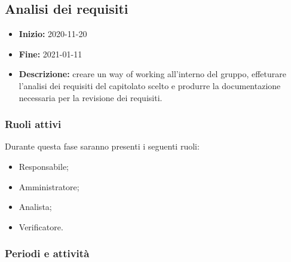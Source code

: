 
\subsection{Analisi dei requisiti} \label{_pianificazioneAnalisiDeiRequisiti}
\begin{itemize}
    \item []\textbf{Inizio:} 2020-11-20
    \item []\textbf{Fine:} 2021-01-11
    \item []\textbf{Descrizione:} creare un way of working all'interno del gruppo, effeturare l'analisi dei requisiti del capitolato scelto e produrre la documentazione necessaria per la revisione dei requisiti.
\end{itemize}

\subsubsection{Ruoli attivi}
Durante questa fase saranno presenti i seguenti ruoli:
\begin{itemize}
    \item Responsabile;
    \item Amministratore;
    \item Analista;
    \item Verificatore.
\end{itemize}

\subsubsection{Periodi e attività}

